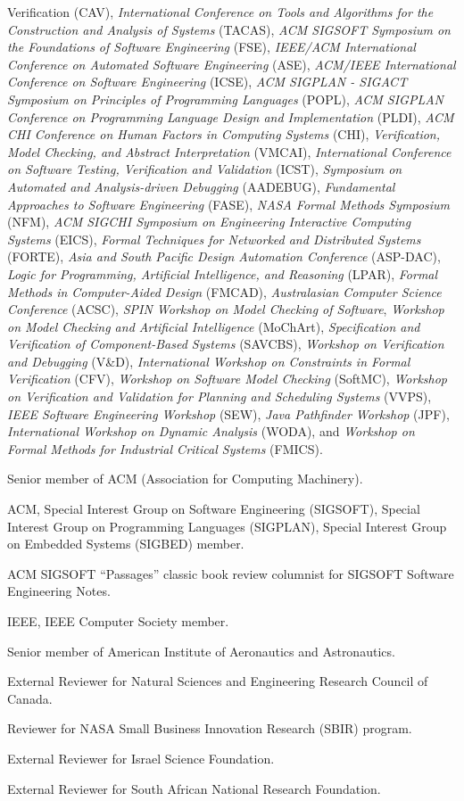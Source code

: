 \documentclass[ComputerScience]{vita}
\begin{document}
\begin{vita}
\begin{Professional Activities and Service}
{  Verification} (CAV), \emph{International Conference on Tools and Algorithms for the Construction and Analysis of Systems} (TACAS), \emph{ACM SIGSOFT Symposium on the Foundations of Software Engineering} (FSE), \emph{IEEE/ACM International Conference on Automated Software Engineering} (ASE), \emph{ACM/IEEE International Conference on Software Engineering} (ICSE), \emph{ACM SIGPLAN - SIGACT Symposium on Principles of Programming Languages} (POPL), \emph{ACM SIGPLAN Conference on Programming Language Design and Implementation} (PLDI), \emph{ACM CHI Conference on Human Factors in Computing Systems} (CHI), \emph{Verification, Model Checking, and Abstract Interpretation} (VMCAI), \emph{International Conference on Software Testing, Verification and Validation} (ICST), \emph{Symposium on Automated and Analysis-driven Debugging} (AADEBUG), \emph{Fundamental Approaches to Software Engineering} (FASE), \emph{NASA Formal Methods Symposium} (NFM), \emph{ACM SIGCHI Symposium on Engineering Interactive Computing Systems} (EICS), \emph{Formal Techniques for Networked and Distributed Systems} (FORTE), \emph{Asia and South Pacific Design Automation Conference} (ASP-DAC), \emph{Logic for Programming, Artificial Intelligence, and Reasoning} (LPAR), \emph{Formal Methods in Computer-Aided Design} (FMCAD), \emph{Australasian Computer Science Conference} (ACSC), \emph{SPIN Workshop on Model Checking of Software}, \emph{Workshop on Model Checking and Artificial Intelligence} (MoChArt), \emph{Specification and Verification of Component-Based Systems} (SAVCBS), \emph{Workshop on Verification and Debugging} (V\&D), \emph{International Workshop on Constraints in Formal Verification} (CFV), \emph{Workshop on Software Model Checking} (SoftMC), \emph{Workshop on Verification and Validation for Planning and Scheduling Systems} (VVPS), \emph{IEEE Software Engineering Workshop} (SEW), \emph{Java Pathfinder Workshop} (JPF), \emph{International Workshop on Dynamic Analysis} (WODA), and \emph{Workshop on Formal Methods for Industrial Critical Systems} (FMICS).
\item Senior member of ACM (Association for Computing Machinery).
  \item ACM, Special Interest Group on Software Engineering (SIGSOFT),
    Special Interest Group on Programming Languages (SIGPLAN), Special
    Interest Group on Embedded Systems (SIGBED) member.
\item ACM SIGSOFT ``Passages'' classic book review columnist for SIGSOFT Software Engineering Notes.
\item IEEE, IEEE Computer Society member.
\item Senior member of American Institute of Aeronautics and Astronautics.
\item External Reviewer for Natural Sciences and Engineering Research Council of Canada.
\item Reviewer for NASA Small Business Innovation Research (SBIR) program.
\item External Reviewer for Israel Science Foundation.
\item External Reviewer for South African National Research Foundation.
\end{Professional Activities and Service}


\end{vita}
\end{document}
